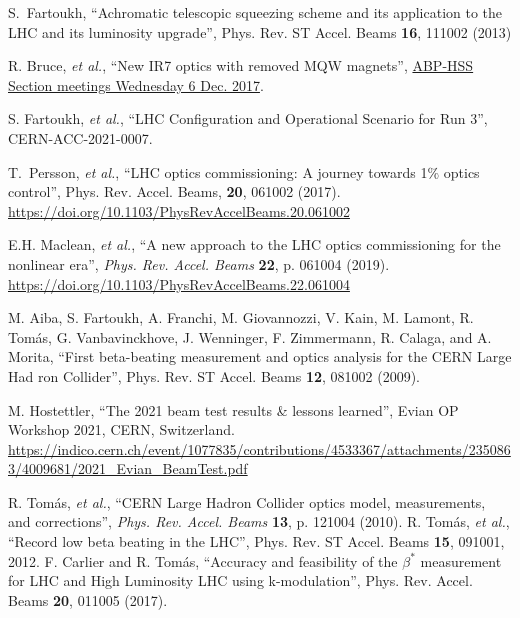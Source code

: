 \documentclass[a4paper]{cernatsnote}
\begin{document}
\begin{thebibliography}{99}   %

S.~Fartoukh, ``Achromatic telescopic squeezing scheme and its application to the LHC and its luminosity upgrade'', Phys. Rev. ST Accel. Beams {\bf16}, 111002 (2013)

 R. Bruce, {\it et al.}, ``New IR7 optics with removed
MQW magnets'',  \href{https://indico.cern.ch/event/681507/contributions/2814548/attachments/1570845/2478033/2017.12.06--HSS_meeting_MQW_removal.pdf}{ABP-HSS Section meetings
Wednesday 6 Dec. 2017}.

 S. Fartoukh, {\it et al.}, 
	``LHC Configuration and Operational Scenario for Run 3'', CERN-ACC-2021-0007.

 T.~Persson, {\it et al.}, ``LHC optics commissioning: A journey towards 1$\%$ optics control'', Phys. Rev. Accel. Beams, \textbf{20}, 061002 (2017).
\url{https://doi.org/10.1103/PhysRevAccelBeams.20.061002}

 E.H. Maclean, {\it et al.}, ``A new approach to the LHC optics commissioning for the nonlinear era'', {\it Phys. Rev. Accel. Beams}  {\bf 22}, p. 061004 (2019).\vspace{-0.03cm}
\url{https://doi.org/10.1103/PhysRevAccelBeams.22.061004}


	


 M. Aiba, S. Fartoukh, A. Franchi, M. Giovannozzi, V. Kain, M. Lamont, R. Tom\'as, G. Vanbavinckhove, J. Wenninger, F. Zimmermann, R. Calaga, and A. Morita, ``First beta-beating measurement and optics analysis for the CERN Large Had ron Collider'', Phys. Rev. ST Accel. Beams {\bf12}, 081002 (2009).

 M. Hostettler, ``The 2021 beam test results & lessons learned'', Evian OP Workshop 2021, CERN, Switzerland. 
\url{https://indico.cern.ch/event/1077835/contributions/4533367/attachments/2350863/4009681/2021_Evian_BeamTest.pdf}


R. Tomás, {\it et al.}, “CERN Large Hadron Collider optics
model, measurements, and corrections”, {\it Phys. Rev. Accel. Beams}  {\bf 13}, p. 121004 (2010).
%
 R. Tom\'as, {\it et al.}, ``Record low beta beating in the LHC'',
Phys. Rev. ST Accel. Beams {\bf15}, 091001, 2012.
%
 F. Carlier and R. Tom\'as, ``Accuracy and feasibility of the $\beta^*$ measurement for LHC and High Luminosity LHC using k-modulation'',
Phys. Rev. Accel. Beams {\bf20}, 011005 (2017).
%


\end{thebibliography}
\end{document}
